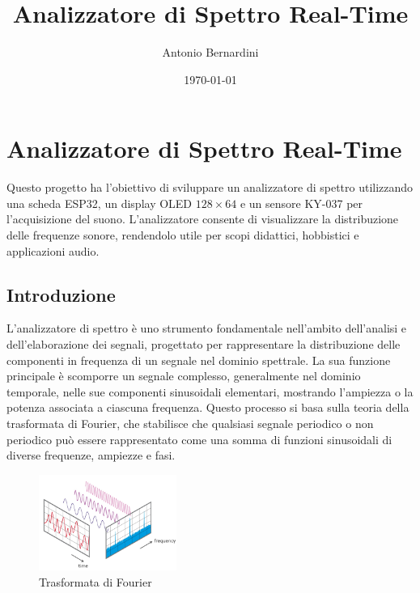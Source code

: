 \documentclass[a4paper,12pt]{report}  %
\title{Analizzatore di Spettro Real-Time}            %
\author{Antonio Bernardini} %
\date{\today}               %
\begin{document}
\maketitle  

\newpage  %

\tableofcontents

\newpage  %

\chapter{Analizzatore di Spettro Real-Time}

Questo progetto ha l'obiettivo di sviluppare un analizzatore di spettro utilizzando una scheda ESP32, un display OLED $128 \times 64$ e un sensore KY-037 per l'acquisizione del suono.
L'analizzatore consente di visualizzare la distribuzione delle frequenze sonore, rendendolo utile per scopi didattici, hobbistici e applicazioni audio.

\section{Introduzione}
L'analizzatore di spettro è uno strumento fondamentale nell'ambito dell'analisi e dell'elaborazione dei segnali, progettato per rappresentare la distribuzione delle componenti in frequenza di un segnale nel dominio spettrale.
La sua funzione principale è scomporre un segnale complesso, generalmente nel dominio temporale, nelle sue componenti sinusoidali elementari, mostrando l'ampiezza o la potenza associata a ciascuna frequenza.
Questo processo si basa sulla teoria della trasformata di Fourier, che stabilisce che qualsiasi segnale periodico o non periodico può essere rappresentato come una somma di funzioni sinusoidali di diverse frequenze, ampiezze e fasi.

\begin{figure}[h]
    \centering
    \includegraphics[width=0.4\textwidth]{imgs/time-to-frequency.png}
    \caption{Trasformata di Fourier}
    \label{fig:time_to_frequency}
\end{figure}
\end{document}
